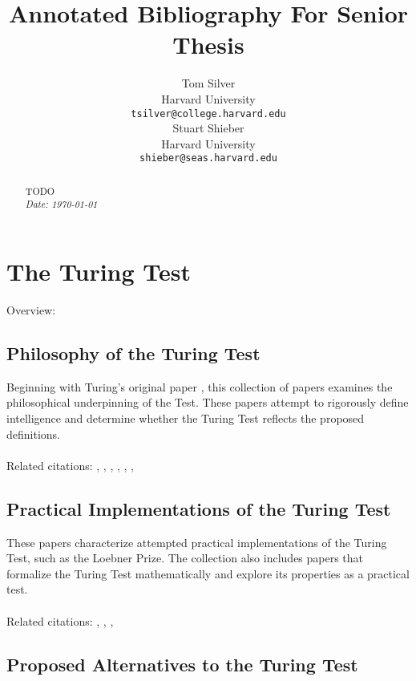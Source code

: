 \documentclass{article} %
\title{Annotated Bibliography For Senior Thesis}
\author{
Tom Silver\\
Harvard University \\
\texttt{tsilver@college.harvard.edu} \\
\And
Stuart Shieber \\
Harvard University \\
\texttt{shieber@seas.harvard.edu} \\
}
\begin{document}
\maketitle

\begin{abstract}
TODO
 \\

\emph{Date: \today}
\end{abstract}

\clearpage


\renewcommand{\contentsname}{Table of Contents}
\setcounter{tocdepth}{2}
\tableofcontents

\clearpage

\section{The Turing Test}
	Overview: \cite{shieber2004turing}

\subsection{Philosophy of the Turing Test}

Beginning with Turing's original paper \cite{turing1950computing}, this collection of papers examines the philosophical underpinning of the Test. These papers attempt to rigorously define intelligence and determine whether the Turing Test reflects the proposed definitions. 
\\
\\ Related citations: \cite{turing1950computing}, \cite{shieber2007turing}, \cite{searle1980minds}, \cite{moor1976analysis}, \cite{moor2001status}, \cite{hayes1995turing}, \cite{cullen2009imitation}

\subsection{Practical Implementations of the Turing Test}

These papers characterize attempted practical implementations of the Turing Test, such as the Loebner Prize. The collection also includes papers that formalize the Turing Test mathematically and explore its properties as a practical test.
\\
\\ Related citations: \cite{weizenbaum1966eliza}, \cite{shieber1994lessons}, \cite{lupkowski2011turing}, \cite{bradford1995formalization}

\subsection{Proposed Alternatives to the Turing Test}
\end{document}
